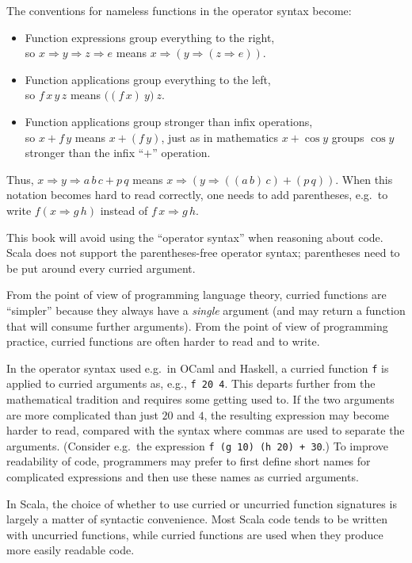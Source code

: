The conventions for nameless functions in the operator syntax become:
\begin{itemize}
\item Function expressions group everything to the right,\\
so $x\Rightarrow y\Rightarrow z\Rightarrow e$ means $x\Rightarrow\left(y\Rightarrow\left(z\Rightarrow e\right)\right)$.
\item Function applications group everything to the left,\\
so $f\,x\,y\,z$ means $\big((f\,x)\:y\big)\:z$.
\item Function applications group stronger than infix operations,\\
so $x+f\,y$ means $x+(f\,y)$, just as in mathematics $x+\cos y$
groups $\cos y$ stronger than the infix ``$+$'' operation.
\end{itemize}
Thus, $x\Rightarrow y\Rightarrow a\,b\,c+p\,q$ means $x\Rightarrow\left(y\Rightarrow\left(\left(a\,b\right)\,c\right)+(p\,q)\right)$.
When this notation becomes hard to read correctly, one needs to add
parentheses, e.g.\ to write $f(x\Rightarrow g\,h)$ instead of $f\,x\Rightarrow g\,h$.

This book will avoid using the ``operator syntax'' when reasoning
about code. Scala does not support the parentheses-free operator syntax;
parentheses need to be put around every curried argument.

From the point of view of programming language theory, curried functions
are ``simpler'' because they always have a \emph{single} argument
(and may return a function that will consume further arguments). From
the point of view of programming practice, curried functions are often
harder to read and to write.

In the operator syntax used e.g.\ in OCaml and Haskell, a curried
function \lstinline!f! is applied to curried arguments as, e.g.,
\lstinline!f 20 4!. This departs further from the mathematical tradition
and requires some getting used to. If the two arguments are more complicated
than just $20$ and $4$, the resulting expression may become harder
to read, compared with the syntax where commas are used to separate
the arguments. (Consider e.g.~the expression \lstinline!f (g 10) (h 20) + 30!.)
To improve readability of code, programmers may prefer to first define
short names for complicated expressions and then use these names as
curried arguments.

In Scala, the choice of whether to use curried or uncurried function
signatures is largely a matter of syntactic convenience. Most Scala
code tends to be written with uncurried functions, while curried functions
are used when they produce more easily readable code.

